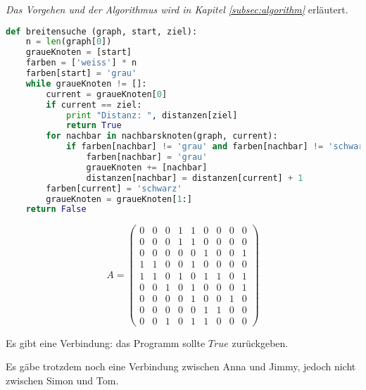 


\begin{lsg}
\textit{Das Vorgehen und der Algorithmus wird in Kapitel \ref{subsec:algorithm}} erl\"autert.
\end{lsg}

\begin{lsg}
\hfill
\begin{lstlisting}[language=Python,basicstyle=\small,tabsize=3]
def breitensuche (graph, start, ziel):
	n = len(graph[0])
	graueKnoten = [start]
	farben = ['weiss'] * n
	farben[start] = 'grau'
	while graueKnoten != []:
		current = graueKnoten[0]
		if current == ziel:
			print "Distanz: ", distanzen[ziel]
			return True
		for nachbar in nachbarsknoten(graph, current):
			if farben[nachbar] != 'grau' and farben[nachbar] != 'schwarz':
				farben[nachbar] = 'grau'
				graueKnoten += [nachbar]
				distanzen[nachbar] = distanzen[current] + 1
		farben[current] = 'schwarz'
		graueKnoten = graueKnoten[1:]
	return False
\end{lstlisting}
\end{lsg}

\begin{lsg}
\[A =  \begin{pmatrix}
  0 & 0 & 0 & 1 & 1 & 0 & 0 & 0 & 0  \\
  0 & 0 & 0 & 1 & 1 & 0 & 0 & 0 & 0  \\
  0 & 0 & 0 & 0 & 0 & 1 & 0 & 0 & 1  \\
  1 & 1 & 0 & 0 & 1 & 0 & 0 & 0 & 0  \\
  1 & 1 & 0 & 1 & 0 & 1 & 1 & 0 & 1  \\
  0 & 0 & 1 & 0 & 1 & 0 & 0 & 0 & 1  \\
  0 & 0 & 0 & 0 & 1 & 0 & 0 & 1 & 0  \\
  0 & 0 & 0 & 0 & 0 & 1 & 1 & 0 & 0  \\
  0 & 0 & 1 & 0 & 1 & 1 & 0 & 0 & 0 
 \end{pmatrix}
  \]
\end{lsg}

\begin{lsg}
Es gibt eine Verbindung: das Programm sollte $True$ zur\"uckgeben.
\end{lsg}

\begin{lsg}
Es g\"abe trotzdem noch eine Verbindung zwischen Anna und Jimmy, jedoch nicht zwischen Simon und Tom.
\end{lsg}

